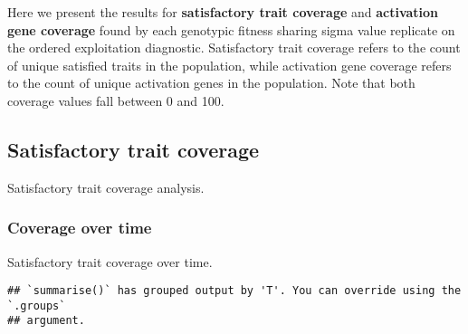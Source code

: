\documentclass[]{book}
\newenvironment{Shaded}{\begin{snugshade}}{\end{snugshade}}
\newcommand{\DataTypeTok}[1]{\textcolor[rgb]{0.13,0.29,0.53}{#1}}
\newcommand{\KeywordTok}[1]{\textcolor[rgb]{0.13,0.29,0.53}{\textbf{#1}}}
\newcommand{\NormalTok}[1]{#1}
\newcommand{\OperatorTok}[1]{\textcolor[rgb]{0.81,0.36,0.00}{\textbf{#1}}}
\newcommand{\StringTok}[1]{\textcolor[rgb]{0.31,0.60,0.02}{#1}}
\begin{document}
Here we present the results for \textbf{satisfactory trait coverage} and \textbf{activation gene coverage} found by each genotypic fitness sharing sigma value replicate on the ordered exploitation diagnostic.
Satisfactory trait coverage refers to the count of unique satisfied traits in the population, while activation gene coverage refers to the count of unique activation genes in the population.
Note that both coverage values fall between 0 and 100.

\hypertarget{satisfactory-trait-coverage-1}{%
\subsection{Satisfactory trait coverage}\label{satisfactory-trait-coverage-1}}

Satisfactory trait coverage analysis.

\hypertarget{coverage-over-time-5}{%
\subsubsection{Coverage over time}\label{coverage-over-time-5}}

Satisfactory trait coverage over time.

\begin{Shaded}
\end{Shaded}

\begin{verbatim}
## `summarise()` has grouped output by 'T'. You can override using the `.groups`
## argument.
\end{verbatim}
\end{document}
